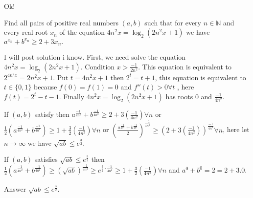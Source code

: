\begin{mysolution}
	Ok!
\begin{tcolorbox}Find all pairs of positive real numbers $(a, b)$ such that for every $n \in\mathbb{N}$ and every real root $x_{n}$ of the equation $4n^{2}x = \log_{2}(2n^{2}x+1)$ we have $a^{x_{n}}+b^{x_{n}}\geq 2+3x_{n}.$\end{tcolorbox}
I will post solution i know.
First, we need solve the equation $4n^{2}x = \log_{2}(2n^{2}x+1)$.
Condition $x>\frac{-1}{2n^{2}}$. This equation is equivalent to $2^{4n^{2}x}=2n^{2}x+1$. Put $t=4n^{2}x+1$ then $2^{t}=t+1$, this equation is equivalent to $t\in\{0,1\}$ because $f(0)=f(1)=0$ and $f''(t)>0\forall t$ , here $f(t)=2^{t}-t-1$. Finally  $4n^{2}x = \log_{2}(2n^{2}x+1)$ has roots $0$ and $\frac{-1}{4n^{2}}$.

If $(a,b)$ satisfy then $a^{\frac{-1}{4n^{2}}}+b^{\frac{-1}{4n^{2}}}\geq 2+3(\frac{-1}{4n^{2}})\forall n$ or $\frac{1}{2}(a^{\frac{-1}{4n^{2}}}+b^{\frac{-1}{4n^{2}}})\geq 1+\frac{3}{2}(\frac{-1}{4n^{2}})\forall n$ or $(\frac{a^{\frac{-1}{4n^{2}}}+b^{\frac{-1}{4n^{2}}}}{2})^{\frac{-1}{4n^{2}}}\geq (2+3(\frac{-1}{4n^{2}}))^{\frac{-1}{4n^{2}}}\forall n$, here let $n\to \infty$ we have $\sqrt{ab}\leq e^{\frac{3}{2}}$.

If $(a,b)$ satisfies $\sqrt{ab}\leq e^{\frac{3}{2}}$ then $\frac{1}{2}(a^{\frac{-1}{4n^{2}}}+b^{\frac{-1}{4n^{2}}})\geq (\sqrt{ab})^{\frac{-1}{4n^{2}}}\geq e^{\frac{3}{2}\cdot\frac{-1}{4n^{2}}}\geq 1+\frac{3}{2}(\frac{-1}{4n^{2}})\forall n$ and $a^{0}+b^{0}=2=2+3.0$.

Answer $\sqrt{ab}\leq e^{\frac{3}{2}}$.
\end{mysolution}



